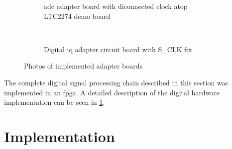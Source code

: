 \documentclass[12pt,a4paper,parskip=full,abstract=true,BCOR=12mm,twoside,open=right]{scrreprt}
\begin{document}
\begin{figure}[htb]
\begin{subfigure}[c]{.49\linewidth}
        \caption{\gls{adc} adapter board with diconnected clock atop LTC2274 demo board}
        \label{fig:adc_adapter_circ}
    \end{subfigure}%
    ~
    \begin{subfigure}[c]{.49\linewidth}
        \centering
        \caption{Digital \gls{iq} adapter circuit board with S\_CLK fix}
        \label{fig:iq_adapter_circ}
    \end{subfigure}
    \caption{Photos of implemented adapter boards}
    \label{fig:adapters}
\end{figure}

The complete digital signal processing chain described in this section was implemented
in an \gls{fpga}. A detailed description of the digital hardware implementation can
be seen in \cref{chap:fpga}.


\chapter{ Implementation}
\label{chap:fpga}
\end{document}
